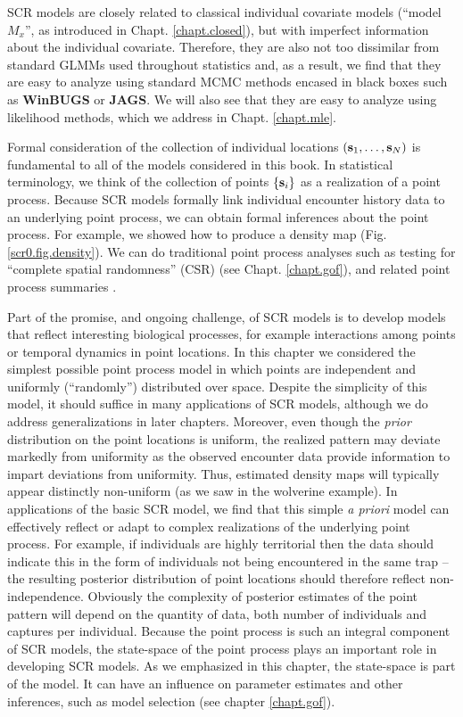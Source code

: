 {SCR models are closely related to 
classical individual covariate models (``model $M_{x}$'', as introduced in
Chapt. \ref{chapt.closed}), but with imperfect information about the
individual covariate. Therefore, 
they are also not too dissimilar from standard GLMMs used throughout
statistics and, as a result, we 
find that they are  easy to analyze using standard MCMC
methods encased in black boxes such as {\bf WinBUGS} or {\bf JAGS}.
We will also see that they are easy to analyze using
likelihood methods, which we address in Chapt. \ref{chapt.mle}.

Formal consideration of the collection of individual locations $({\bf
  s}_{1}, \ldots, {\bf s}_{N})$ is fundamental to all of the models
considered in this book. In statistical terminology, we think of the
collection of points $\{ {\bf s}_{i} \}$ as a realization of a point
process.  Because SCR models formally link individual encounter
history data to an underlying point process, we can obtain formal
inferences about the point process. For example, we showed how to
produce a density map (Fig. \ref{scr0.fig.density}). We can do
traditional point process analyses such as testing for ``complete
spatial randomness'' (CSR) (see Chapt.  \ref{chapt.gof}), and related
point process summaries \citep{illian_etal:2008}.

Part of the promise, and ongoing challenge, of SCR
models is to develop models that reflect interesting biological
processes, for example interactions among points or temporal dynamics
in point locations.  In this chapter  we considered the simplest possible point
process model in which points are independent and uniformly
(``randomly'') distributed over space. Despite the simplicity of this
model, it should suffice in many applications of SCR models,
although we do address generalizations in later
chapters. Moreover, even though the {\it prior} distribution on the
point locations is uniform, the realized pattern may deviate markedly
from uniformity as the observed encounter data provide information to
impart deviations from uniformity. Thus,  estimated density maps
will typically appear distinctly non-uniform (as we saw in the
wolverine example).
In
applications of the basic SCR model, we find that this simple {\it a priori}
model can effectively reflect or adapt to complex realizations of the
underlying point process.  For example, if individuals are highly
territorial then the data should indicate this in the form of
individuals not being encountered in the same trap -- the resulting
posterior distribution of point locations should therefore reflect
non-independence.  Obviously the complexity of posterior estimates of
the point pattern will depend on the quantity of data, both number of
individuals and captures per individual.  Because the point process is
such an integral component of SCR models, the state-space of the point
process plays an important role in developing SCR models. As we
emphasized in this chapter, the state-space is part of
the model. It can have an influence on parameter estimates and other
inferences, such as model selection (see chapter \ref{chapt.gof}).


}
